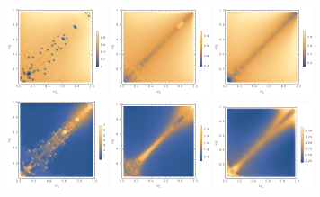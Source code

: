 \documentclass[%
reprint,
superscriptaddress,
amsmath,amssymb,
aps,
prd,
floatfix,
nofootinbib
]{revtex4-1}
\begin{document}
\begin{figure}
\begin{figure}
  \centering
    \includegraphics[width=0.32\textwidth]{plot/energy-ratio-axion-1d.png}
    \includegraphics[width=0.32\textwidth]{plot/energy-ratio-axion-2d.png}
    \includegraphics[width=0.32\textwidth]{plot/energy-ratio-axion-3d.png} \\\vskip-5pt
    \includegraphics[width=0.32\textwidth]{plot/r_max-axion-1d.png}
    \includegraphics[width=0.32\textwidth]{plot/r_max-axion-2d.png}
    \includegraphics[width=0.32\textwidth]{plot/r_max-axion-3d.png} \\\vskip-5pt

\end{figure}
\end{figure}
\end{document}
